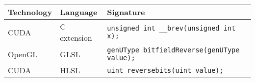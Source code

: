\begin{tabular}{|l|l|l|}
	\hline
	Technology & Language & Signature \\ \hline
	CUDA & C extension & \texttt{unsigned int \_\_brev(unsigned int x);} \\
	OpenGL & GLSL & \texttt{genUType bitfieldReverse(genUType value);} \\
	CUDA & HLSL & \texttt{uint reversebits(uint value);} \\ \hline
\end{tabular}